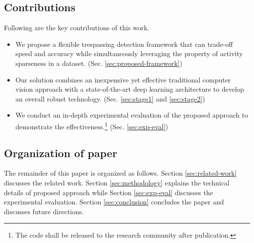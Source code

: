 \subsection{Contributions}
Following are the key contributions of this work. 
\begin{itemize}
\item We propose a flexible trespassing detection framework that can trade-off speed and accuracy while simultaneously leveraging the property of activity sparseness in a dataset. (Sec. \ref{sec:proposed-framework})

\item Our solution combines an inexpensive yet effective traditional computer vision approach with a state-of-the-art deep learning architecture to develop an overall robust technology. (Sec. \ref{sec:stage1} and \ref{sec:stage2})

\item We conduct an in-depth experimental evaluation of the proposed approach to demonstrate the effectiveness.\footnote{The code shall be released to the research community after publication.} (Sec. \ref{sec:exp-eval})
\end{itemize}
\subsection{Organization of paper}
The remainder of this paper is organized as follows.  Section \ref{sec:related-work} discusses the related work. Section \ref{sec:methodology} explains the technical details of proposed approach while Section \ref{sec:exp-eval} discusses the experimental evaluation. Section \ref{sec:conclusion} concludes the paper and discusses future directions. 